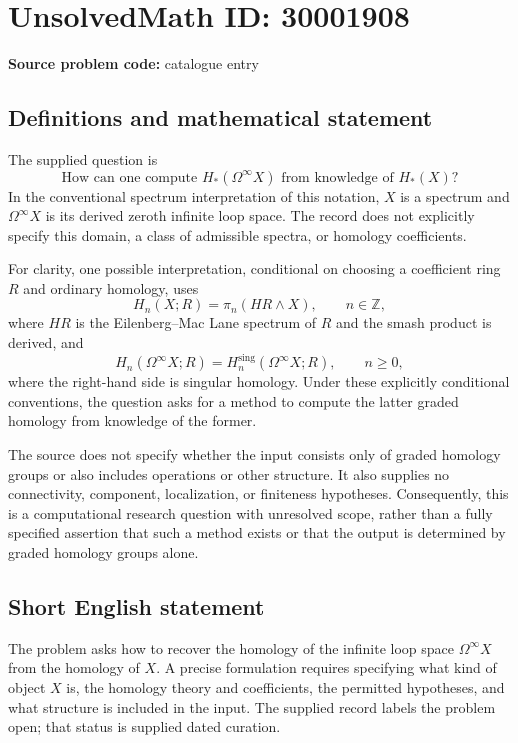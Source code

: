 \documentclass[11pt]{article}
\newcommand{\Z}{\mathbb{Z}}
\begin{document}
\section*{UnsolvedMath ID: 30001908}
\textbf{Source problem code:} catalogue entry
\subsection{Definitions and mathematical statement}
The supplied question is
\[
\text{How can one compute }H_*(\Omega^\infty X)\text{ from knowledge of }H_*(X)\text{?}
\]
In the conventional spectrum interpretation of this notation, \(X\) is a spectrum and \(\Omega^\infty X\) is its derived zeroth infinite loop space. The record does not explicitly specify this domain, a class of admissible spectra, or homology coefficients.

For clarity, one possible interpretation, conditional on choosing a coefficient ring \(R\) and ordinary homology, uses
\[
H_n(X;R)=\pi_n(HR\wedge X),\qquad n\in\Z,
\]
where \(HR\) is the Eilenberg--Mac Lane spectrum of \(R\) and the smash product is derived, and
\[
H_n(\Omega^\infty X;R)=H_n^{\mathrm{sing}}(\Omega^\infty X;R),\qquad n\geq 0,
\]
where the right-hand side is singular homology. Under these explicitly conditional conventions, the question asks for a method to compute the latter graded homology from knowledge of the former.

The source does not specify whether the input consists only of graded homology groups or also includes operations or other structure. It also supplies no connectivity, component, localization, or finiteness hypotheses. Consequently, this is a computational research question with unresolved scope, rather than a fully specified assertion that such a method exists or that the output is determined by graded homology groups alone.
\subsection{Short English statement}
The problem asks how to recover the homology of the infinite loop space \(\Omega^\infty X\) from the homology of \(X\). A precise formulation requires specifying what kind of object \(X\) is, the homology theory and coefficients, the permitted hypotheses, and what structure is included in the input. The supplied record labels the problem open; that status is supplied dated curation.
\end{document}
